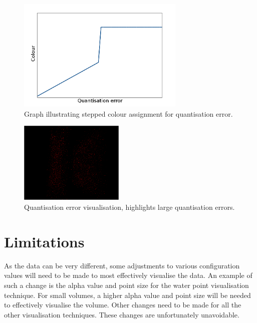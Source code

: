 \begin{figure}[h!]
  \begin{center}
    \includegraphics[width=80mm]{quant_colour_graph}
  \end{center}
  \caption{Graph illustrating stepped colour assignment for quantisation error.}
  \label{fig:implementation_quantgraph}
\end{figure}

\begin{figure}[h!]
  \begin{center}
    \includegraphics[width=50mm]{quanterror}
  \end{center}
  \caption{Quantisation error visualisation, highlights large quantisation
  errors.}
  \label{fig:implementation_quanterror}
\end{figure}



\section{Limitations}
\label{sec:implementation_limitations}

As the data can be very different, some adjustments to various configuration
values will need to be made to most effectively visualise the data. An example
of such a change is the alpha value and point size for the water point
visualisation technique. For small volumes, a higher alpha value and point size
will be needed to effectively visualise the volume. Other changes need to be
made for all the other visualisation techniques. These changes are
unfortunately unavoidable.

